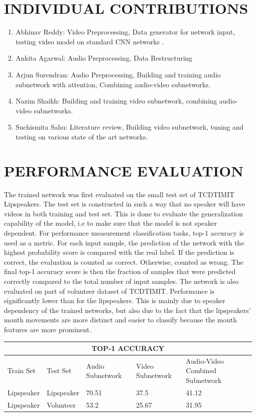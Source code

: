 \documentclass{article}
\begin{document}
\section{INDIVIDUAL CONTRIBUTIONS}
\begin{enumerate}
    \item Abhinav Reddy: Video Preprocessing, Data generator for network input, testing video model on standard CNN networks .
    \item Ankita Agarwal: Audio Preprocessing, Data Restructuring
    \item Arjun Surendran: Audio Preprocessing, Building and training audio subnetwork with attention, Combining audio-video subnetworks.
    \item Nazim Shaikh: Building and training video subnetwork, combining audio-video subnetworks.
    \item Suchismita Sahu: Literature review, Building video subnetwork, tuning and testing on various state of the art networks.
\end{enumerate}


\section{PERFORMANCE EVALUATION}
The trained network was first evaluated on the small test set of TCDTIMIT Lipspeakers. The test set is constructed in such a way that no speaker will have videos in both training and test set. This is done to evaluate the generalization capability of the model, i.e to make sure that the model is not speaker dependent. For performance measurement classification tasks, top-1 accuracy is used as a metric. For each input sample, the prediction of the network with the highest probability score is compared with the real label. If the prediction is correct, the evaluation is counted as correct. Otherwise, counted as wrong. The final top-1 accuracy score is then the fraction of samples that were predicted correctly compared to the total number of input samples.
The network is also evaluated on part of volunteer dataset of TCDTIMIT. Performance is significantly lower than for the lipspeakers. This is mainly due to speaker dependency of the trained networks, but also due to the fact that the lipspeakers' mouth movements are more distinct and easier to classify because the mouth features are more prominent.

\bigskip
\begin{tabular}{ |p{2cm}|p{2cm}||p{3cm}|p{3cm}|p{3cm}|  }
 \hline
 \multicolumn{5}{|c|}{TOP-1 ACCURACY} \\
 \hline
 Train Set & Test Set & Audio Subnetwork & Video Subnetwork & Audio-Video Combined Subnetwork \\
 \hline
 Lipspeaker & Lipspeaker & 70.51 & 37.5 & 41.12\\
 Lipspeaker & Volunteer & 53.2 & 25.67 & 31.95\\
 \hline
\end{tabular}
\bigskip
\end{document}
